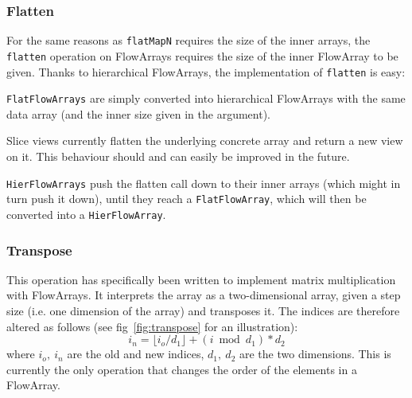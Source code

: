 \documentclass[runningheads,a4paper,fleqn]{llncs}
\begin{document}
\subsubsection{Flatten}
For the same reasons as \texttt{flatMapN} requires the size of the
inner arrays, the \texttt{flatten} operation on FlowArrays requires
the size of the inner FlowArray to be given. Thanks to hierarchical
FlowArrays, the implementation of \texttt{flatten} is easy:

\texttt{FlatFlowArrays} are simply converted into hierarchical
FlowArrays with the same data array (and the inner size given in the
argument).

Slice views currently flatten the underlying concrete array and return
a new view on it. This behaviour should and can easily be improved in
the future.

\texttt{HierFlowArrays} push the flatten call down to their inner
arrays (which might in turn push it down), until they reach a
\texttt{FlatFlowArray}, which will then be converted into a
\texttt{HierFlowArray}.

\subsubsection{Transpose}
This operation has specifically been written to implement matrix
multiplication with FlowArrays. It interprets the array as a
two-dimensional array, given a step size (i.e. one dimension of the
array) and transposes it. The indices are therefore altered as
follows (see fig~\ref{fig:transpose} for an illustration):
\[ i_n = \lfloor i_o / d_1 \rfloor + (i \bmod d_1) * d_2 \]
where $i_o,\ i_n$ are the old and new indices, $d_1,\ d_2$ are the two
dimensions. This is currently the only operation that changes the
order of the elements in a FlowArray.
\end{document}
